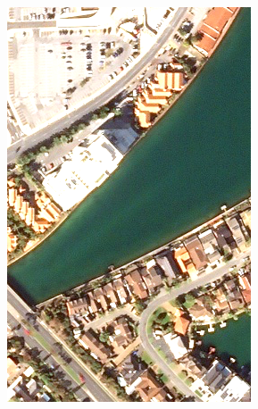 \documentclass[10pt,journal]{IEEEtran}  %
\begin{document}
\begin{figure}[h!]
\begin{subfigure}{0.31\linewidth}
\includegraphics[width = \textwidth]{figures/pb_bad_dr_high.png}
\end{subfigure}
\begin{subfigure}{0.31\linewidth}
\centering

\end{subfigure}
\end{figure}
\end{document}
